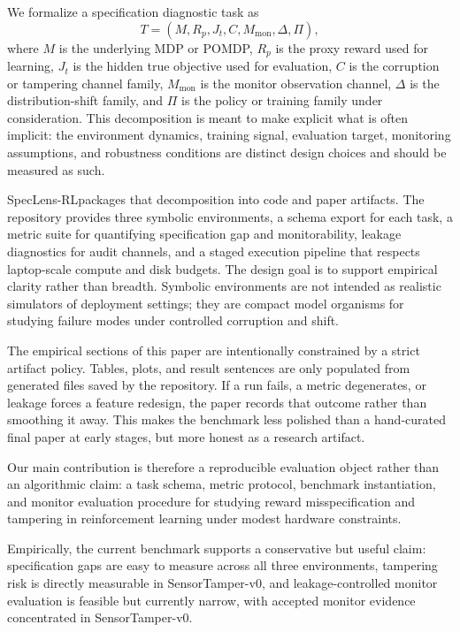 \documentclass[10pt,twocolumn,letterpaper]{article}
\newcommand{\framework}{SpecLens-RL}
\begin{document}
We formalize a specification diagnostic task as
\[
T = (M, R_p, J_t, C, M_{\mathrm{mon}}, \Delta, \Pi),
\]
where $M$ is the underlying MDP or POMDP, $R_p$ is the proxy reward used for
learning, $J_t$ is the hidden true objective used for evaluation, $C$ is the
corruption or tampering channel family, $M_{\mathrm{mon}}$ is the monitor
observation channel, $\Delta$ is the distribution-shift family, and $\Pi$ is
the policy or training family under consideration. This decomposition is meant
to make explicit what is often implicit: the environment dynamics, training
signal, evaluation target, monitoring assumptions, and robustness conditions are
distinct design choices and should be measured as such.

\framework packages that decomposition into code and paper artifacts. The
repository provides three symbolic environments, a schema export for each task,
a metric suite for quantifying specification gap and monitorability, leakage
diagnostics for audit channels, and a staged execution pipeline that respects
laptop-scale compute and disk budgets. The design goal is to support empirical
clarity rather than breadth. Symbolic environments are not intended as realistic
simulators of deployment settings; they are compact model organisms for studying
failure modes under controlled corruption and shift.

The empirical sections of this paper are intentionally constrained by a strict
artifact policy. Tables, plots, and result sentences are only populated from
generated files saved by the repository. If a run fails, a metric degenerates,
or leakage forces a feature redesign, the paper records that outcome rather than
smoothing it away. This makes the benchmark less polished than a hand-curated
final paper at early stages, but more honest as a research artifact.

Our main contribution is therefore a reproducible evaluation object rather than
an algorithmic claim: a task schema, metric protocol, benchmark instantiation,
and monitor evaluation procedure for studying reward misspecification and
tampering in reinforcement learning under modest hardware constraints.

Empirically, the current benchmark supports a conservative but useful claim:
specification gaps are easy to measure across all three environments, tampering
risk is directly measurable in SensorTamper-v0, and leakage-controlled monitor
evaluation is feasible but currently narrow, with accepted monitor evidence
concentrated in SensorTamper-v0.
\end{document}
